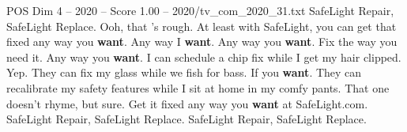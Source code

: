 \begin{textsample}{POS Dim 4 – 2020 – Score 1.00 – 2020/tv\_com\_2020\_31.txt}  \label{ex:f4_pos_048}
SafeLight Repair, SafeLight Replace.
Ooh, that 's rough.
At least with SafeLight, you can get that fixed any way you \textbf{want}.
Any way I \textbf{want}.
Any way you \textbf{want}.
Fix the way you need it.
Any way you \textbf{want}.
I can schedule a chip fix while I get my hair clipped.
Yep.
They can fix my glass while we fish for bass.
If you \textbf{want}.
They can recalibrate my safety features while I sit at home in my comfy pants.
That one doesn't rhyme, but sure.
Get it fixed any way you \textbf{want} at SafeLight.com.
SafeLight Repair, SafeLight Replace.
SafeLight Repair, SafeLight Replace.

\end{textsample}
